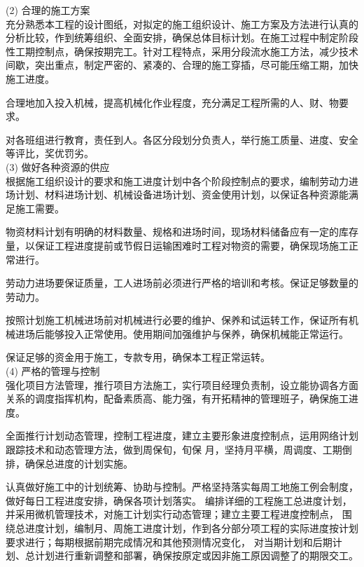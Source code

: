 (2) 合理的施工方案\\

 充分熟悉本工程的设计图纸，对拟定的施工组织设计、施工方案及方法进行认真的分析比较，作到统筹组织、全面安排，确保总体目标计划。在施工过程中制定阶段性工期控制点，确保按期完工。针对工程特点，采用分段流水施工方法，减少技术间歇，突出重点，制定严密的、紧凑的、合理的施工穿插，尽可能压缩工期，加快施工进度。

 合理地加入投入机械，提高机械化作业程度，充分满足工程所需的人、财、物要求。

 对各班组进行教育，责任到人。各区分段划分负责人，举行施工质量、进度、安全等评比，奖优罚劣。\\

(3) 做好各种资源的供应\\

 根据施工组织设计的要求和施工进度计划中各个阶段控制点的要求，编制劳动力进场计划、材料进场计划、机械设备进场计划、资金使用计划，以保证各种资源能满足施工需要。

 物资材料计划有明确的材料数量、规格和进场时间，现场材料储备应有一定的库存量，以保证工程进度提前或节假日运输困难时工程对物资的需要，确保现场施工正常进行。

 劳动力进场要保证质量，工人进场前必须进行严格的培训和考核。保证足够数量的劳动力。

 按照计划施工机械进场前对机械进行必要的维护、保养和试运转工作，保证所有机械进场后能够投入正常使用。使用期间加强维护与保养，确保机械能正常运行。

 保证足够的资金用于施工，专款专用，确保本工程正常运转。\\

(4) 严格的管理与控制\\

 强化项目方法管理，推行项目方法施工，实行项目经理负责制，设立能协调各方面关系的调度指挥机构，配备素质高、能力强，有开拓精神的管理班子，确保施工进度。

 全面推行计划动态管理，控制工程进度，建立主要形象进度控制点，运用网络计划跟踪技术和动态管理方法，做到周保旬，旬保
月，坚持月平横，周调度、工期倒排，确保总进度的计划实施。

 认真做好施工中的计划统筹、协助与控制。严格坚持落实每周工地施工例会制度，做好每日工程进度安排，确保各项计划落实。
编排详细的工程施工总进度计划，并采用微机管理技术，对施工计划实行动态管理；建立主要工程进度控制点，
围绕总进度计划，编制月、周施工进度计划，作到各分部分项工程的实际进度按计划要求进行；每期根据前期完成情况和其他预测情况变化，
对当期计划和后期计划、总计划进行重新调整和部署，确保按原定或因非施工原因调整了的期限交工。

